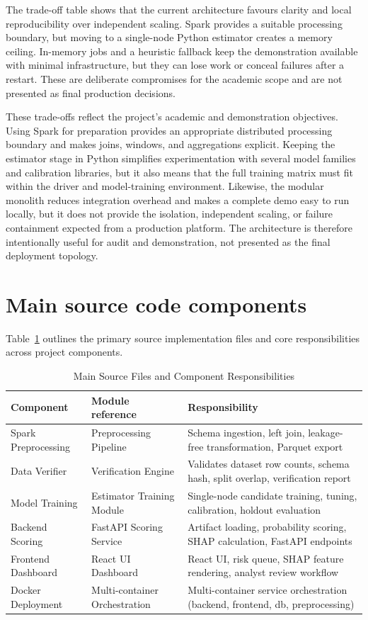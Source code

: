 The trade-off table shows that the current architecture favours clarity and
local reproducibility over independent scaling. Spark provides a suitable
processing boundary, but moving to a single-node Python estimator creates a
memory ceiling. In-memory jobs and a heuristic fallback keep the demonstration
available with minimal infrastructure, but they can lose work or conceal
failures after a restart. These are deliberate compromises for the academic
scope and are not presented as final production decisions.

These trade-offs reflect the project's academic and demonstration objectives.
Using Spark for preparation provides an appropriate distributed processing
boundary and makes joins, windows, and aggregations explicit. Keeping the
estimator stage in Python simplifies experimentation with several model
families and calibration libraries, but it also means that the full training
matrix must fit within the driver and model-training environment. Likewise,
the modular monolith reduces integration overhead and makes a complete demo
easy to run locally, but it does not provide the isolation, independent
scaling, or failure containment expected from a production platform. The
architecture is therefore intentionally useful for audit and demonstration,
not presented as the final deployment topology.

\section{Main source code components}

Table~\ref{tab:main-source-files} outlines the primary source implementation files and core responsibilities across project components.

\begin{table}[H]
\centering
\small
{}
\caption{Main Source Files and Component Responsibilities}
\label{tab:main-source-files}
\begin{tabularx}{\textwidth}{p{}p{}X}
\toprule
\textbf{Component} & \textbf{Module reference} & \textbf{Responsibility}\\
\midrule
Spark Preprocessing & Preprocessing Pipeline & Schema ingestion, left join, leakage-free transformation, Parquet export\\
Data Verifier & Verification Engine & Validates dataset row counts, schema hash, split overlap, verification report\\
Model Training & Estimator Training Module & Single-node candidate training, tuning, calibration, holdout evaluation\\
Backend Scoring & FastAPI Scoring Service & Artifact loading, probability scoring, SHAP calculation, FastAPI endpoints\\
Frontend Dashboard & React UI Dashboard & React UI, risk queue, SHAP feature rendering, analyst review workflow\\
Docker Deployment & Multi-container Orchestration & Multi-container service orchestration (backend, frontend, db, preprocessing)\\
\bottomrule
\end{tabularx}
\end{table}

